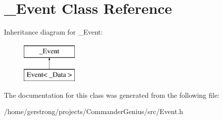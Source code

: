 \hypertarget{class___event}{
\section{\_\-Event Class Reference}
\label{class___event}
}
Inheritance diagram for \_\-Event:\begin{figure}[H]
\begin{center}
\leavevmode
\includegraphics[height=2cm]{class___event}
\end{center}
\end{figure}


The documentation for this class was generated from the following file:\begin{DoxyCompactItemize}
\item 
/home/gerstrong/projects/CommanderGenius/src/Event.h\end{DoxyCompactItemize}
